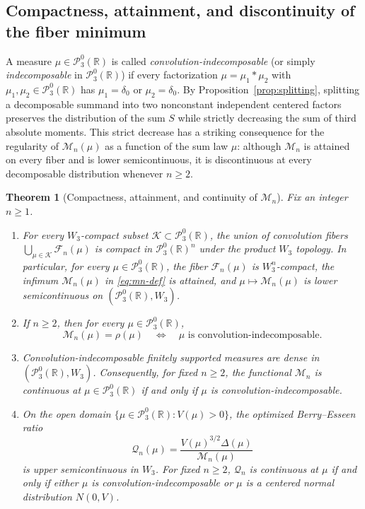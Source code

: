\documentclass[11pt]{article}
\numberwithin{equation}{section}
\newtheorem{theorem}{Theorem}[section]
\theoremstyle{definition}
\theoremstyle{remark}
\newcommand{\R}{\mathbb R}
\begin{document}
\subsection{Compactness, attainment, and discontinuity of the fiber minimum}

A measure $\mu\in\mathcal P_3^0(\R)$ is called \emph{convolution-indecomposable}
(or simply \emph{indecomposable} in $\mathcal P_3^0(\R)$) if every
factorization $\mu=\mu_1*\mu_2$ with $\mu_1,\mu_2\in\mathcal P_3^0(\R)$ has
$\mu_1=\delta_0$ or $\mu_2=\delta_0$. By Proposition~\ref{prop:splitting},
splitting a decomposable summand into two nonconstant independent centered
factors preserves the distribution of the sum $S$ while strictly decreasing
the sum of third absolute moments. This strict decrease has a striking
consequence for the regularity of $\mathcal M_n(\mu)$ as a function of the
sum law $\mu$: although $\mathcal M_n$ is attained on every fiber and is
lower semicontinuous, it is discontinuous at every decomposable distribution
whenever $n\ge2$.

\begin{theorem}[Compactness, attainment, and continuity of $\mathcal M_n$]\label{thm:fiber-regularity}
Fix an integer $n\ge1$.
\begin{enumerate}[label=(\roman*),leftmargin=2em]
\item\label{it:fiber-compact} For every $W_3$-compact subset
$\mathcal K\subset\mathcal P_3^0(\R)$, the union of convolution fibers
$\bigcup_{\mu\in\mathcal K}\mathcal F_n(\mu)$ is compact in
$\mathcal P_3^0(\R)^n$ under the product $W_3$ topology. In particular, for
every $\mu\in\mathcal P_3^0(\R)$, the fiber $\mathcal F_n(\mu)$ is
$W_3^n$-compact, the infimum $\mathcal M_n(\mu)$ in \eqref{eq:mn-def} is
attained, and $\mu\mapsto\mathcal M_n(\mu)$ is lower semicontinuous on
$(\mathcal P_3^0(\R),W_3)$.
\item\label{it:indecomp-criterion} If $n\ge2$, then for every
$\mu\in\mathcal P_3^0(\R)$,
\begin{equation}\label{eq:mn-equals-rho}
 \mathcal M_n(\mu)=\rho(\mu)
 \quad\Longleftrightarrow\quad
 \mu\text{ is convolution-indecomposable}.
\end{equation}
\item\label{it:dense-indecomp} Convolution-indecomposable finitely supported
measures are dense in $(\mathcal P_3^0(\R),W_3)$. Consequently, for fixed
$n\ge2$, the functional $\mathcal M_n$ is continuous at
$\mu\in\mathcal P_3^0(\R)$ if and only if $\mu$ is convolution-indecomposable.
\item\label{it:ratio-continuity} On the open domain
$\{\mu\in\mathcal P_3^0(\R):V(\mu)>0\}$, the optimized Berry--Esseen ratio
\[
 \mathcal Q_n(\mu)=\frac{V(\mu)^{3/2}\Delta(\mu)}{\mathcal M_n(\mu)}
\]
is upper semicontinuous in $W_3$. For fixed $n\ge2$, $\mathcal Q_n$ is
continuous at $\mu$ if and only if either $\mu$ is convolution-indecomposable
or $\mu$ is a centered normal distribution $N(0,V)$.
\end{enumerate}
\end{theorem}
\end{document}
